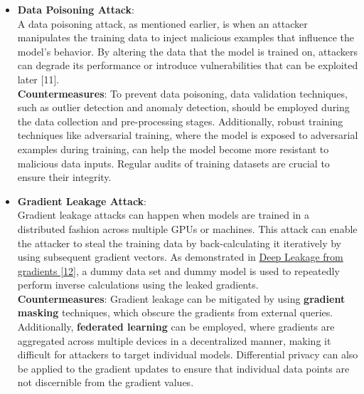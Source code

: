 \documentclass[12pt]{article}
\begin{document}
\begin{itemize}
        \item \textbf{Data Poisoning Attack}: \\
        A data poisoning attack, as mentioned earlier, is when an attacker manipulates the training data to inject malicious examples that influence the model's behavior. By altering the data that the model is trained on, attackers can degrade its performance or introduce vulnerabilities that can be exploited later [11]. \\
        \textbf{Countermeasures}: To prevent data poisoning, data validation techniques, such as outlier detection and anomaly detection, should be employed during the data collection and pre-processing stages. Additionally, robust training techniques like adversarial training, where the model is exposed to adversarial examples during training, can help the model become more resistant to malicious data inputs. Regular audits of training datasets are crucial to ensure their integrity. \\

        \item \textbf{Gradient Leakage Attack}: \\
        Gradient leakage attacks can happen when models are trained in a distributed fashion across multiple GPUs or machines. This attack can enable the attacker to steal the training data by back-calculating it iteratively by using subsequent gradient vectors.
        As demonstrated in \href{https://arxiv.org/pdf/1906.08935}{Deep Leakage from gradients [12]}, a dummy data set and dummy model is used to repeatedly perform inverse calculations using the leaked gradients. \\
        \textbf{Countermeasures}: Gradient leakage can be mitigated by using \textbf{gradient masking} techniques, which obscure the gradients from external queries. Additionally, \textbf{federated learning} can be employed, where gradients are aggregated across multiple devices in a decentralized manner, making it difficult for attackers to target individual models. Differential privacy can also be applied to the gradient updates to ensure that individual data points are not discernible from the gradient values.
    \end{itemize}
\end{document}
